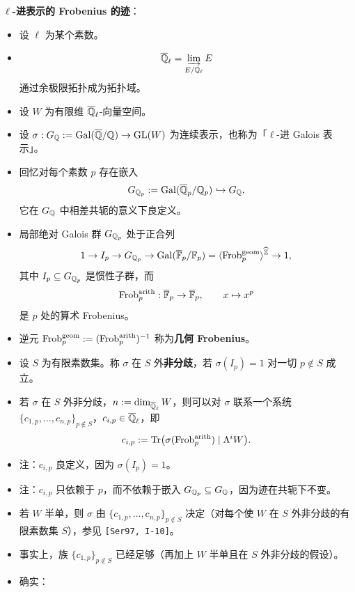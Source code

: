 \textbf{$\ell$-进表示的 Frobenius 的迹}：
\begin{itemize}
\item 设 $\ell$ 为某个素数。
\item
\[
\overline{\mathbb{Q}}_\ell=\varinjlim_{E/\mathbb{Q}_\ell}E
\]
通过余极限拓扑成为拓扑域。
\item 设 $W$ 为有限维 $\overline{\mathbb{Q}}_\ell$-向量空间。
\item 设 $\sigma:G_{\mathbb{Q}}:=\operatorname{Gal}(\overline{\mathbb{Q}}/\mathbb{Q})\to\operatorname{GL}(W)$ 为连续表示，也称为「$\ell$-进 Galois 表示」。
\item 回忆对每个素数 $p$ 存在嵌入
\[
G_{\mathbb{Q}_p}:=\operatorname{Gal}(\overline{\mathbb{Q}}_p/\mathbb{Q}_p)\hookrightarrow G_{\mathbb{Q}},
\]
它在 $G_{\mathbb{Q}}$ 中相差共轭的意义下良定义。
\item 局部绝对 Galois 群 $G_{\mathbb{Q}_p}$ 处于正合列
\[
1\to I_p\to G_{\mathbb{Q}_p}\to\operatorname{Gal}(\overline{\mathbb{F}}_p/\mathbb{F}_p)=\langle\operatorname{Frob}_p^{\mathrm{geom}}\rangle^{\widehat{\mathbb{Z}}}\to1,
\]
其中 $I_p\subseteq G_{\mathbb{Q}_p}$ 是惯性子群，而
\[
\operatorname{Frob}_p^{\mathrm{arith}}:\overline{\mathbb{F}}_p\to\overline{\mathbb{F}}_p,\qquad x\mapsto x^p
\]
是 $p$ 处的算术 Frobenius。
\item 逆元 $\operatorname{Frob}_p^{\mathrm{geom}}:=(\operatorname{Frob}_p^{\mathrm{arith}})^{-1}$ 称为\textbf{几何 Frobenius}。
\item 设 $S$ 为有限素数集。称 $\sigma$ 在 $S$ 外\textbf{非分歧}，若 $\sigma(I_p)=1$ 对一切 $p\notin S$ 成立。
\item 若 $\sigma$ 在 $S$ 外非分歧，$n:=\dim_{\overline{\mathbb{Q}}_\ell}W$，则可以对 $\sigma$ 联系一个系统 $\{c_{1,p},\dots,c_{n,p}\}_{p\notin S}$，$c_{i,p}\in\overline{\mathbb{Q}}_\ell$，即
\[
c_{i,p}:=\operatorname{Tr}\bigl(\sigma(\operatorname{Frob}_p^{\mathrm{arith}})\mid\Lambda^iW\bigr).
\]
\item 注：$c_{i,p}$ 良定义，因为 $\sigma(I_p)=1$。
\item 注：$c_{i,p}$ 只依赖于 $p$，而不依赖于嵌入 $G_{\mathbb{Q}_p}\subseteq G_{\mathbb{Q}}$，因为迹在共轭下不变。
\item 若 $W$ 半单，则 $\sigma$ 由 $\{c_{1,p},\dots,c_{n,p}\}_{p\notin S}$ 决定（对每个使 $W$ 在 $S$ 外非分歧的有限素数集 $S$），参见 \texttt{[Ser97, I-10]}。
\item 事实上，族 $\{c_{1,p}\}_{p\notin S}$ 已经足够（再加上 $W$ 半单且在 $S$ 外非分歧的假设）。
\item 确实：
\begin{itemize}

\end{itemize}
\end{itemize}
